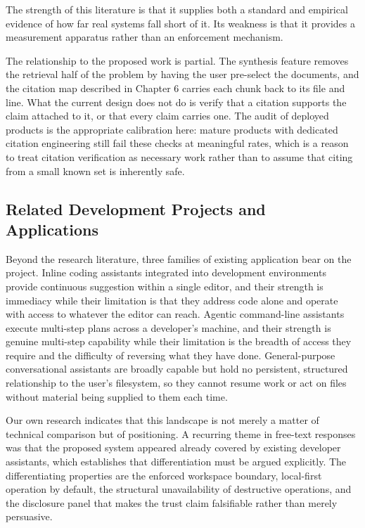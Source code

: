 \documentclass{FastFyp}
\begin{document}
The strength of this literature is that it supplies both a standard and empirical evidence of how far real systems fall short of it. Its weakness is that it provides a measurement apparatus rather than an enforcement mechanism.

The relationship to the proposed work is partial. The synthesis feature removes the retrieval half of the problem by having the user pre-select the documents, and the citation map described in Chapter 6 carries each chunk back to its file and line. What the current design does not do is verify that a citation supports the claim attached to it, or that every claim carries one. The audit of deployed products is the appropriate calibration here: mature products with dedicated citation engineering still fail these checks at meaningful rates, which is a reason to treat citation verification as necessary work rather than to assume that citing from a small known set is inherently safe.

\subsection{Related Development Projects and Applications}
Beyond the research literature, three families of existing application bear on the project. Inline coding assistants integrated into development environments provide continuous suggestion within a single editor, and their strength is immediacy while their limitation is that they address code alone and operate with access to whatever the editor can reach. Agentic command-line assistants execute multi-step plans across a developer's machine, and their strength is genuine multi-step capability while their limitation is the breadth of access they require and the difficulty of reversing what they have done. General-purpose conversational assistants are broadly capable but hold no persistent, structured relationship to the user's filesystem, so they cannot resume work or act on files without material being supplied to them each time.

Our own research indicates that this landscape is not merely a matter of technical comparison but of positioning. A recurring theme in free-text responses was that the proposed system appeared already covered by existing developer assistants, which establishes that differentiation must be argued explicitly. The differentiating properties are the enforced workspace boundary, local-first operation by default, the structural unavailability of destructive operations, and the disclosure panel that makes the trust claim falsifiable rather than merely persuasive.
\end{document}
